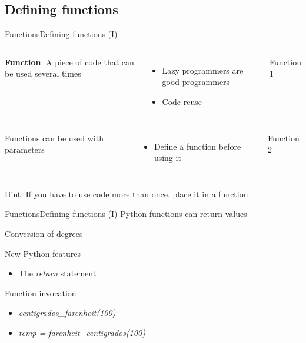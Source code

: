 \documentclass[10pt,compress]{beamer} %
\begin{document}
\subsection{Defining functions}
\begin{frame}{Functions}{Defining functions (I)}
    \begin{columns}
	\textbf{Function}: A piece of code that can be used several times
		\begin{itemize}
		\item Lazy programmers are good programmers
		\item Code reuse
		\end{itemize}
		\begin{block}{Function 1}
		\vspace{-0.2cm}
		
		\vspace{-0.2cm}
		\end{block}
	\end{columns}

    \begin{columns}
	Functions can be used with parameters
		\begin{itemize}
		\item Define a function before using it
		\end{itemize}

		\begin{block}{Function 2}
		\vspace{-0.2cm}
		
		\vspace{-0.2cm}
		\end{block}
	\end{columns}
	\bigskip
	\centering \alert{Hint: If you have to use code more than once, place it in a function}
\end{frame}

\begin{frame}{Functions}{Defining functions (I)}
	Python functions can return values
    
		\begin{exampleblock}{Conversion of degrees}
		\vspace{-0.2cm}
		
		\vspace{-0.2cm}
		\end{exampleblock}

	\vspace{0.2cm}
	New Python features
	\begin{itemize}
		\item The \textit{return} statement
	\end{itemize}
    Function invocation 
	\begin{itemize}
        \item \textit{centigrados\_farenheit(100)}
        \item \textit{temp = farenheit\_centigrados(100)}
	\end{itemize}
\end{frame}
\end{document}
